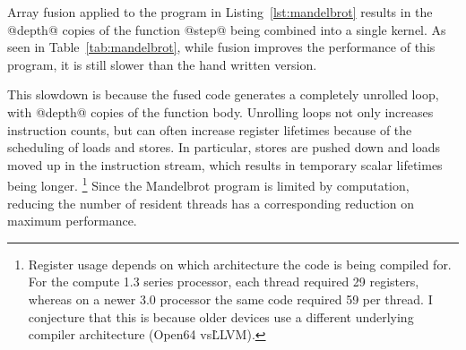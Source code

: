 
Array fusion applied to the program in Listing~\ref{lst:mandelbrot} results in
the @depth@ copies of the function @step@ being combined into a single kernel.
As seen in Table~\ref{tab:mandelbrot}, while fusion improves the performance of
this program, it is still slower than the hand written version.

This slowdown is because the fused code generates a completely unrolled loop,
with @depth@ copies of the function body. Unrolling loops not only increases
instruction counts, but can often increase register lifetimes because of the
scheduling of loads and stores. In particular, stores are pushed down and loads
moved up in the instruction stream, which results in temporary scalar lifetimes
being longer.%
\footnote{\label{ft:fixed_unrolling}Register usage depends on which architecture
the code is being compiled for. For the compute 1.3 series processor, each
thread required 29 registers, whereas on a newer 3.0 processor the same code
required 59 per thread. I conjecture that this is because older devices use a
different underlying compiler architecture (Open64 vs\. LLVM).}
Since the Mandelbrot program is limited by computation, reducing the number of
resident threads has a corresponding reduction on maximum performance.

